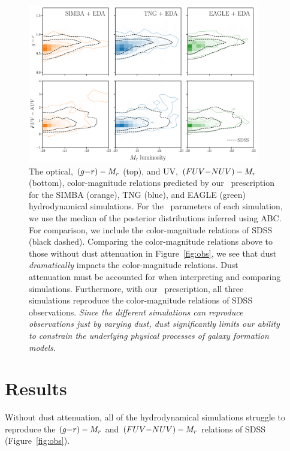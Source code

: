 \begin{figure}
\begin{center}
    \includegraphics[width=0.9\textwidth]{figs/abc_observables.pdf}
    \caption{\label{fig:dem}
    The optical, $(g{-}r) - M_r$ (top), and UV, $(FUV{-}NUV) - M_r$ (bottom),
    color-magnitude relations predicted by our \eda~prescription
    for the SIMBA (orange), TNG (blue), and EAGLE (green) hydrodynamical
    simulations. For the \eda~parameters of each simulation, we use the
    median of the posterior distributions inferred using ABC. For
    comparison, we include the color-magnitude relations of SDSS (black
    dashed). Comparing the color-magnitude relations above to those without
    dust attenuation in Figure~\ref{fig:obs}, we see that dust
    \emph{dramatically} impacts the color-magnitude relations. 
    Dust attenuation must be accounted for when interpreting and comparing
    simulations. Furthermore, with our \eda~prescription, all three
    simulations reproduce the color-magnitude relations of SDSS
    observations.  \emph{Since the different simulations can reproduce
    observations just by varying dust, dust significantly limits our ability to
    constrain the underlying physical processes of galaxy formation
    models.}
    }
\end{center}
\end{figure}

\section{Results} \label{sec:results}
Without dust attenuation, all of the hydrodynamical simulations struggle to 
reproduce the $(g{-}r) - M_r$ and $(FUV{-}NUV) - M_r$ relations of SDSS (Figure~\ref{fig:obs}). 

